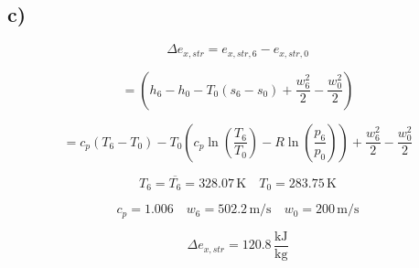 

\subsection*{c)}

\[
\Delta e_{x,str} = e_{x,str,6} - e_{x,str,0}
\]

\[
= (h_6 - h_0 - T_0 (s_6 - s_0) + \frac{w_6^2}{2} - \frac{w_0^2}{2})
\]

\[
= c_p (T_6 - T_0) - T_0 (c_p \ln \left( \frac{T_6}{T_0} \right) - R \ln \left( \frac{p_6}{p_0} \right)) + \frac{w_6^2}{2} - \frac{w_0^2}{2}
\]

\[
T_6 = \overline{T_6} = 328.07 \, \text{K} \quad T_0 = 283.75 \, \text{K}
\]

\[
c_p = 1.006 \quad w_6 = 502.2 \, \text{m/s} \quad w_0 = 200 \, \text{m/s}
\]

\[
\Delta e_{x,str} = 120.8 \, \frac{\text{kJ}}{\text{kg}}
\]